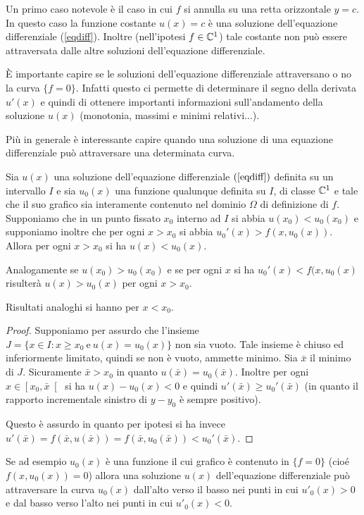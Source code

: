 Un primo caso notevole è il caso in cui $f$ si annulla su una
retta orizzontale $y=c$.
In questo caso la funzione costante $u(x)=c$ è una
soluzione dell'equazione differenziale (\ref{eqdiff}).
Inoltre
(nell'ipotesi $f\in\mathbb C^1$) tale costante non può essere
attraversata dalle altre soluzioni dell'equazione differenziale.

\`E importante capire se le soluzioni dell'equazione differenziale
attraversano o no la curva $\{f=0\}$. Infatti questo ci permette di
determinare il segno della derivata $u'(x)$ e quindi di ottenere
importanti informazioni sull'andamento della soluzione $u(x)$
(monotonia, massimi e minimi relativi...).

Più in generale è interessante capire quando una soluzione di una
equazione differenziale può attraversare una determinata curva.

\begin{theorem}\label{nonpassa}
Sia $u(x)$ una soluzione dell'equazione differenziale $(\ref{eqdiff})$
definita su un intervallo $I$ e sia $u_0(x)$ una funzione qualunque
definita su $I$, di classe $\mathbb C^1$ e tale che il suo grafico sia
interamente contenuto nel dominio $\Omega$ di definizione di $f$.
Supponiamo che in un punto fissato $x_0$ interno ad $I$ si abbia
$u(x_0)<u_0(x_0)$ e supponiamo inoltre che per ogni $x>x_0$ si abbia
$u_0'(x)>f(x,u_0(x))$. Allora per ogni $x>x_0$ si ha $u(x)<u_0(x)$.

Analogamente se $u(x_0)>u_0(x_0)$ e se per ogni $x$ si ha
$u_0'(x)<f(x,u_0(x)$ risulterà $u(x)>u_0(x)$ per ogni $x>x_0$.

Risultati analoghi si hanno per $x<x_0$.
\end{theorem}

\begin{proof}
Supponiamo per assurdo che l'insieme $J=\{x\in I: x\ge x_0\
\mathrm{e}\ u(x)=u_0(x)\}$ non sia vuoto.
Tale insieme è chiuso ed
inferiormente limitato, quindi se non è vuoto, ammette minimo.
Sia $\bar x$ il minimo di $J$.
Sicuramente $\bar x>x_0$ in quanto $u(\bar
x)=u_0(\bar x)$.
Inoltre per ogni $x\in \left[x_0,\bar x\right[$ si ha
$u(x)-u_0(x)<0$ e quindi $u'(\bar x) \ge u_0'(\bar x)$ (in quanto
il rapporto incrementale sinistro di $y-y_0$ è sempre positivo).

Questo è assurdo in quanto per ipotesi si ha invece $u'(\bar x) =
f(\bar x, u(\bar x)) = f(\bar x ,u_0(\bar x)) < u_0'(\bar x)$.
\end{proof}

Se ad esempio $u_0(x)$ è una funzione
il cui grafico è contenuto in $\{f=0\}$
(cioé $f(x,u_0(x))=0$) allora una soluzione $u(x)$ dell'equazione
differenziale può attraversare la curva $u_0(x)$ dall'alto verso il
basso nei punti in cui $u'_0(x)>0$ e dal basso verso l'alto nei punti
in cui $u'_0(x)<0$.


